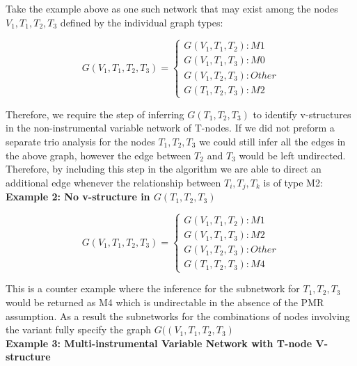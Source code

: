 \documentclass[12pt]{report}
\begin{document}
Take the example above as one such network that may exist among the nodes $V_1, T_1, T_2, T_3$ defined by the individual graph types:

\[ G(V_1, T_1, T_2, T_3)=\begin{cases}G(V_1,T_1,T_2):M1 \\ G(V_1, T_1,T_3):M0 \\ G(V_1, T_2,T_3):Other \\  G(T_1,T_2,T_3):M2 \end{cases}\]

Therefore, we require the step of inferring $G(T_1, T_2, T_3)$ to identify v-structures in the non-instrumental variable network of T-nodes. If we did not preform a separate trio analysis for the nodes $T_1, T_2, T_3$ we could still infer all the edges in the above graph, however the edge between $T_2$ and $T_3$ would be left undirected. Therefore, by including this step in the algorithm we are able to direct an additional edge whenever the relationship between $T_i, T_j, T_k$ is of type M2:\\

\textbf{Example 2: No v-structure in $G(T_1, T_2, T_3)$}

\begin{center}
\end{center}

\[ G(V_1, T_1, T_2, T_3)=\begin{cases}G(V_1,T_1,T_2):M1 \\ G(V_1, T_1,T_3):M2 \\ G(V_1, T_2,T_3):Other \\ G(T_1, T_2, T_3):M4 \end{cases}\]

This is a counter example where the inference for the subnetwork for $T_1, T_2, T_3$ would be returned as M4 which is undirectable in the absence of the PMR assumption. As a result the subnetworks for the combinations of nodes involving the variant fully specify the graph $G((V_1, T_1, T_2, T_3)$\\

\textbf{Example 3: Multi-instrumental Variable Network with T-node V-structure }
\end{document}
